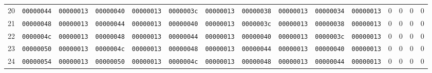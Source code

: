 \begin{tabular}{lllllllllllllll}
20 & \texttt{00000044} & \texttt{00000013} & \texttt{00000040} & \texttt{00000013} & \texttt{0000003c} & \texttt{00000013} & \texttt{00000038} & \texttt{00000013} & \texttt{00000034} & \texttt{00000013} & 0 & 0 & 0 & 0 \\
21 & \texttt{00000048} & \texttt{00000013} & \texttt{00000044} & \texttt{00000013} & \texttt{00000040} & \texttt{00000013} & \texttt{0000003c} & \texttt{00000013} & \texttt{00000038} & \texttt{00000013} & 0 & 0 & 0 & 0 \\
22 & \texttt{0000004c} & \texttt{00000013} & \texttt{00000048} & \texttt{00000013} & \texttt{00000044} & \texttt{00000013} & \texttt{00000040} & \texttt{00000013} & \texttt{0000003c} & \texttt{00000013} & 0 & 0 & 0 & 0 \\
23 & \texttt{00000050} & \texttt{00000013} & \texttt{0000004c} & \texttt{00000013} & \texttt{00000048} & \texttt{00000013} & \texttt{00000044} & \texttt{00000013} & \texttt{00000040} & \texttt{00000013} & 0 & 0 & 0 & 0 \\
24 & \texttt{00000054} & \texttt{00000013} & \texttt{00000050} & \texttt{00000013} & \texttt{0000004c} & \texttt{00000013} & \texttt{00000048} & \texttt{00000013} & \texttt{00000044} & \texttt{00000013} & 0 & 0 & 0 & 0 \\
\hline
\end{tabular}
